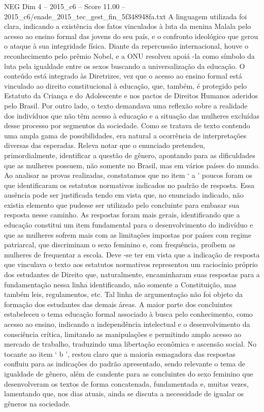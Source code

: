 \begin{textsample}{NEG Dim 4 – 2015\_c6 – Score 11.00 – 2015\_c6/enade\_2015\_tec\_gest\_fin\_5f348948fa.txt}
A linguagem utilizada foi clara, indicando a existência dos fatos vinculados à luta da menina Malala pelo acesso ao ensino formal das jovens do seu país, e o confronto ideológico que gerou o ataque à sua integridade física.
Diante da repercussão internacional, houve o reconhecimento pelo prêmio Nobel, e a ONU resolveu apoiá -la como símbolo da luta pela igualdade entre os sexos buscando a universalização da educação.
O conteúdo está integrado às Diretrizes, vez que o acesso ao ensino formal está vinculado ao direito constitucional à educação, que, também, é protegido pelo Estatuto da Criança e do Adolescente e nos pactos de Direitos Humanos aderidos pelo Brasil.
Por outro lado, o texto demandava uma reflexão sobre a realidade dos indivíduos que não têm acesso à educação e a situação das mulheres excluídas desse processo por segmentos da sociedade.
Como se tratava de texto contendo uma ampla gama de possibilidades, era natural a ocorrência de interpretações diversas das esperadas.
Releva notar que o enunciado pretendeu, primordialmente, identificar a questão de gênero, apontando para as dificuldades que as mulheres possuem, não somente no Brasil, mas em vários países do mundo.
Ao analisar as provas realizadas, constatamos que no item ‘ a ’ poucos foram os que identificaram os estatutos normativos indicados no padrão de resposta.
Essa ausência pode ser justificada tendo em vista que, no enunciado indicado, não existia elemento que pudesse ser utilizado pelo concluinte para embasar sua resposta nesse caminho.
As respostas foram mais gerais, identificando que a educação constitui um item fundamental para o desenvolvimento do indivíduo e que as mulheres sofrem mais com as limitações impostas por países com regime patriarcal, que discriminam o sexo feminino e, com frequência, proíbem as mulheres de frequentar a escola.
Deve -se ter em vista que a indicação de resposta que vinculava o texto aos estatutos normativos representou um raciocínio próprio dos estudantes de Direito que, naturalmente, encaminharam suas respostas para a fundamentação nessa linha identificando, não somente a Constituição, mas também leis, regulamentos, etc.
Tal linha de argumentação não foi objeto da formação dos estudantes das demais áreas.
A maior parte dos concluintes estabeleceu o tema educação formal associado à busca pelo conhecimento, como acesso ao ensino, indicando a independência intelectual e o desenvolvimento da consciência crítica, limitando as manipulações e permitindo amplo acesso ao mercado de trabalho, traduzindo uma libertação econômica e ascensão social.
No tocante ao item ‘ b ’, restou claro que a maioria esmagadora das respostas confluiu para as indicações do padrão apresentado, sendo relevante o tema de igualdade de gênero, além de candente para as concluintes do sexo feminino que desenvolveram os textos de forma concatenada, fundamentada e, muitas vezes, lamentando que, nos dias atuais, ainda se discuta a necessidade de igualar os gêneros na sociedade.

\end{textsample}

